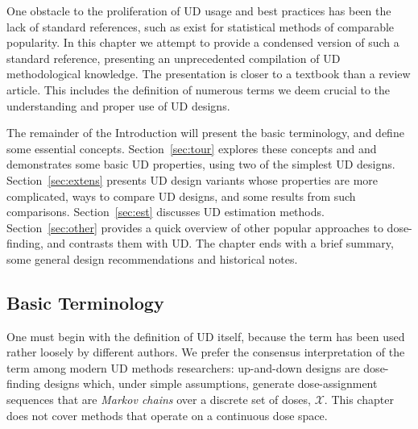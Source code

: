 One obstacle to the proliferation of UD usage and best practices has been the lack of standard references, such as exist for statistical methods of comparable popularity.  In this chapter we attempt to provide a condensed version of such a standard reference, presenting an unprecedented compilation of UD methodological knowledge. The presentation is closer to a textbook than a review article. This includes the definition of numerous terms we deem crucial to the understanding and proper use of UD designs.


The remainder of the Introduction will present the basic terminology, and define some essential concepts. Section~\ref{sec:tour} explores these concepts and and demonstrates some basic UD properties, using two of the simplest UD designs. Section~\ref{sec:extens} presents UD design variants whose properties are more complicated, ways to compare UD designs, and some results from such comparisons. Section~\ref{sec:est} discusses UD estimation methods. Section~\ref{sec:other} provides a quick overview of other popular approaches to dose-finding, and contrasts them with UD. The chapter ends with a brief summary, some general design recommendations and historical notes.

\subsection{Basic Terminology}\label{sec:terminol}

One must begin with the definition of UD itself, because the term has been used rather loosely by different authors. We prefer the consensus interpretation of the term among modern UD methods researchers: up-and-down designs are dose-finding designs which, under simple assumptions, generate dose-assignment sequences that are \emph{Markov chains} over a discrete set of doses, $\mathcal{X}$. This chapter does not cover methods that operate on a continuous dose space.


